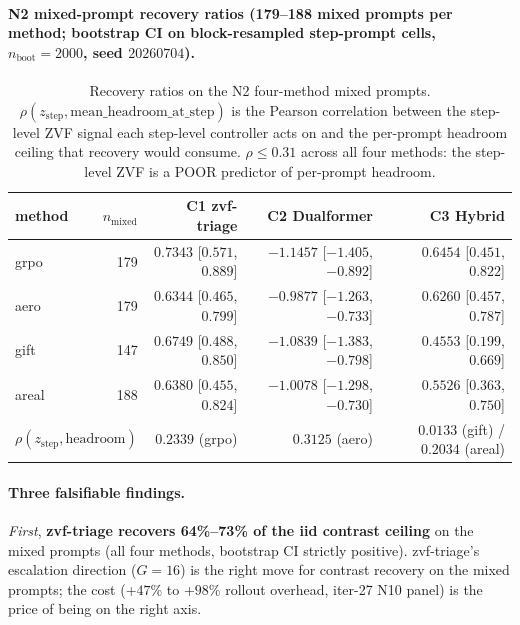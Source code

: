 \paragraph{N2 mixed-prompt recovery ratios (179--188 mixed prompts
per method; bootstrap CI on block-resampled step-prompt cells,
$n_{\mathrm{boot}}{=}2000$, seed $20260704$).}

\begin{table}[t]
\centering
\caption{Recovery ratios on the N2 four-method mixed prompts.
$\rho(z_{\mathrm{step}}, \mathrm{mean\_headroom\_at\_step})$ is the
Pearson correlation between the step-level ZVF signal each step-level
controller acts on and the per-prompt headroom ceiling that recovery
would consume. $\rho \le 0.31$ across all four methods: the step-level
ZVF is a POOR predictor of per-prompt headroom.}
\label{tab:p7-headroom-recovery}
\begin{tabular}{lrrrr}
\toprule
method & $n_{\mathrm{mixed}}$ & C1 zvf-triage & C2 Dualformer & C3 Hybrid \\
\midrule
grpo  & 179 & $\mathbf{0.7343}$ [$0.571$, $0.889$] & $\mathbf{-1.1457}$ [$-1.405$, $-0.892$] & $0.6454$ [$0.451$, $0.822$] \\
aero  & 179 & $\mathbf{0.6344}$ [$0.465$, $0.799$] & $\mathbf{-0.9877}$ [$-1.263$, $-0.733$] & $0.6260$ [$0.457$, $0.787$] \\
gift  & 147 & $\mathbf{0.6749}$ [$0.488$, $0.850$] & $\mathbf{-1.0839}$ [$-1.383$, $-0.798$] & $0.4553$ [$0.199$, $0.669$] \\
areal & 188 & $\mathbf{0.6380}$ [$0.455$, $0.824$] & $\mathbf{-1.0078}$ [$-1.298$, $-0.730$] & $0.5526$ [$0.363$, $0.750$] \\
\midrule
\multicolumn{2}{l}{$\rho(z_{\mathrm{step}}, \mathrm{headroom})$} & $0.2339$ (grpo) & $0.3125$ (aero) & $0.0133$ (gift) / $0.2034$ (areal) \\
\bottomrule
\end{tabular}
\end{table}

\paragraph{Three falsifiable findings.}

\emph{First}, \textbf{zvf-triage recovers 64\%--73\% of the iid
contrast ceiling} on the mixed prompts (all four methods, bootstrap CI
strictly positive). zvf-triage's escalation direction ($G{=}16$) is
the right move for contrast recovery on the mixed prompts; the cost
(+$47$\% to +$98$\% rollout overhead, iter-27 N10 panel) is the price
of being on the right axis.

